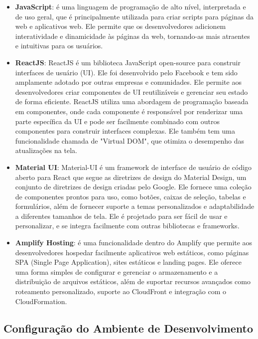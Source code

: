 \begin{itemize} \label{itemize:cliente_production}
    \item \textbf{JavaScript}: é uma linguagem de programação de alto nível, interpretada e de uso geral, que é principalmente utilizada para criar scripts para páginas da web e aplicativos web. Ele permite que os desenvolvedores adicionem interatividade e dinamicidade às páginas da web, tornando-as mais atraentes e intuitivas para os usuários.
    \item \textbf{ReactJS}: ReactJS é um biblioteca JavaScript open-source para construir interfaces de usuário (UI). Ele foi desenvolvido pelo Facebook e tem sido amplamente adotado por outras empresas e comunidades. Ele permite aos desenvolvedores criar componentes de UI reutilizáveis e gerenciar seu estado de forma eficiente. ReactJS utiliza uma abordagem de programação baseada em componentes, onde cada componente é responsável por renderizar uma parte específica da UI e pode ser facilmente combinado com outros componentes para construir interfaces complexas. Ele também tem uma funcionalidade chamada de "Virtual DOM", que otimiza o desempenho das atualizações na tela.
    \item \textbf{Material UI}: Material-UI é um framework de interface de usuário de código aberto para React que segue as diretrizes de design do Material Design, um conjunto de diretrizes de design criadas pelo Google. Ele fornece uma coleção de componentes prontos para uso, como botões, caixas de seleção, tabelas e formulários, além de fornecer suporte a temas personalizados e adaptabilidade a diferentes tamanhos de tela. Ele é projetado para ser fácil de usar e personalizar, e se integra facilmente com outras bibliotecas e frameworks.
    \item \textbf{Amplify Hosting}: é uma funcionalidade dentro do Amplify que permite aos desenvolvedores hospedar facilmente aplicativos web estáticos, como páginas SPA (Single Page Application), sites estáticos e landing pages. Ele oferece uma forma simples de configurar e gerenciar o armazenamento e a distribuição de arquivos estáticos, além de suportar recursos avançados como roteamento personalizado, suporte ao CloudFront e integração com o CloudFormation.
\end{itemize}

\subsection{Configuração do Ambiente de Desenvolvimento}

